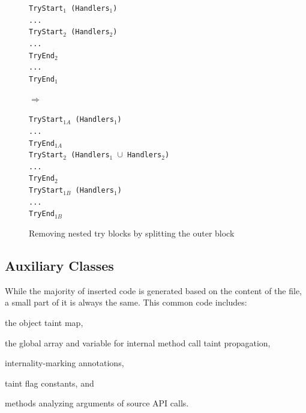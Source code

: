 \documentclass[12pt,twoside,notitlepage]{report}
\newcommand{\asm}[1] {\texttt{#1}}
\begin{document}
\begin{figure}[h]
	\centering
	\begin{minipage}{0.265\textwidth}
	\begin{footnotesize}
		\asm{TryStart$_1$ (Handlers$_1$)} \\
		\asm{...} \\
		\asm{TryStart$_2$ (Handlers$_2$)} \\
		\asm{...} \\
		\asm{TryEnd$_2$} \\
		\asm{...} \\
		\asm{TryEnd$_1$}
	\end{footnotesize}
	\end{minipage}
	\begin{minipage}{0.09\textwidth}
	\centering
	$\Rightarrow$
	\end{minipage}
	\begin{minipage}{0.42\textwidth}
	\begin{footnotesize}
		\asm{TryStart$_{1A}$ (Handlers$_1$)} \\
		\asm{...} \\
		\asm{TryEnd$_{1A}$} \\
		\asm{TryStart$_2$ (Handlers$_1$ $\cup$ Handlers$_2$)} \\
		\asm{...} \\
		\asm{TryEnd$_2$} \\
		\asm{TryStart$_{1B}$ (Handlers$_1$)} \\
		\asm{...} \\
		\asm{TryEnd$_{1B}$}
	\end{footnotesize}
	\end{minipage}
	\caption{Removing nested try blocks by splitting the outer block}
	\label{figure:Instrumentation_TryBlockSplitting}
\end{figure}

\subsection{Auxiliary Classes}

While the majority of inserted code is generated based on the content of the file, a small part of it is always the same. This common code includes:
\begin{inparaenum}[(i)]
\item the object taint map,
\item the global array and variable for internal method call taint propagation,
\item internality-marking annotations,
\item taint flag constants, and
\item methods analyzing arguments of source API calls.
\end{inparaenum}
\end{document}
